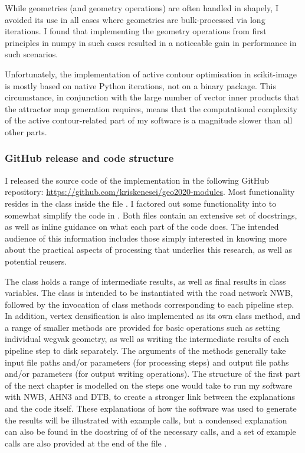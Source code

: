 While geometries (and geometry operations) are often handled in shapely, I avoided its use in all cases where geometries are bulk-processed via long iterations. I found that implementing the geometry operations from first principles in numpy in such cases resulted in a noticeable gain in performance in such scenarios.

Unfortunately, the implementation of active contour optimisation in scikit-image is mostly based on native Python iterations, not on a binary package. This circumstance, in conjunction with the large number of vector inner products that the attractor map generation requires, means that the computational complexity of the active contour-related part of my software is a magnitude slower than all other parts.

\subsubsection{GitHub release and code structure}

I released the source code of the implementation in the following GitHub repository:
\url{https://github.com/kriskenesei/geo2020-modules}. Most functionality resides in the class  inside the file . I factored out some functionality into  to somewhat simplify the code in . Both files contain an extensive set of docstrings, as well as inline guidance on what each part of the code does. The intended audience of this information includes those simply interested in knowing more about the practical aspects of processing that underlies this research, as well as potential reusers.

The class  holds a range of intermediate results, as well as final results in class variables. The class is intended to be instantiated with the road network NWB, followed by the invocation of class methods corresponding to each pipeline step. In addition, vertex densification is also implemented as its own class method, and a range of smaller methods are provided for basic operations such as setting individual wegvak geometry, as well as writing the intermediate results of each pipeline step to disk separately. The arguments of the methods generally take input file paths and/or parameters (for processing steps) and  output file paths and/or parameters (for output writing operations). The structure of the first part of the next chapter is modelled on the steps one would take to run my software with NWB, AHN3 and DTB, to create a stronger link between the explanations and the code itself. These explanations of how the software was used to generate the results will be illustrated with example calls, but a condensed explanation can also be found in the docstring of  of the necessary calls, and a set of example calls are also provided at the end of the file .